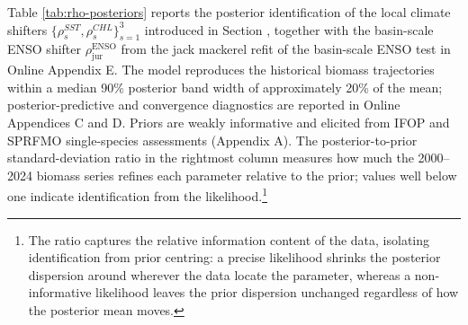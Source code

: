 \documentclass[
  11pt,
]{article}
\begin{document}
Table \ref{tab:rho-posteriors} reports the posterior identification of
the local climate shifters \(\{\rho_s^{SST}, \rho_s^{CHL}\}_{s=1}^{3}\)
introduced in Section \emph{}, together with the
basin-scale ENSO shifter \(\rho^{\text{ENSO}}_{\text{jur}}\) from the
jack mackerel refit of the basin-scale ENSO test in Online Appendix E. The model reproduces the historical biomass trajectories within a median 90\% posterior band width of approximately 20\% of the mean; posterior-predictive and convergence diagnostics are reported in Online Appendices C and D. Priors are weakly informative
and elicited from IFOP and SPRFMO single-species assessments (Appendix A). The
posterior-to-prior standard-deviation ratio in the rightmost column
measures how much the 2000--2024 biomass series refines each parameter
relative to the prior; values well below one indicate identification from
the likelihood.\footnote{The ratio captures the relative information content of the data, isolating identification from prior centring: a precise likelihood shrinks the posterior dispersion around wherever the data locate the parameter, whereas a non-informative likelihood leaves the prior dispersion unchanged regardless of how the posterior mean moves.}
\end{document}
